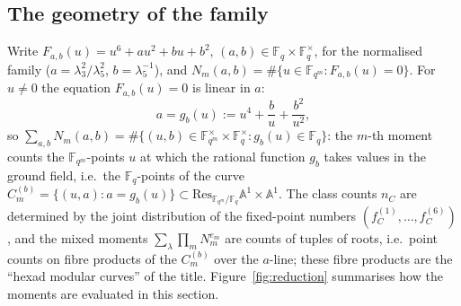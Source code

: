 \documentclass[12pt,a4paper]{amsart}
\theoremstyle{definition}
\newcommand{\F}{\mathbb{F}}
\begin{document}
\subsection{The geometry of the family}
Write $F_{a,b}(u)=u^6+au^2+bu+b^2$, $(a,b)\in\F_q\times\F_q^\times$, for the normalised family ($a=\lambda_3^2/\lambda_5^2$, $b=\lambda_5^{-1}$), and $N_m(a,b)=\#\{u\in\F_{q^m}:F_{a,b}(u)=0\}$. For $u\ne0$ the equation $F_{a,b}(u)=0$ is linear in $a$:
\begin{equation}\label{eq:a}
a=g_b(u):=u^4+\frac bu+\frac{b^2}{u^2},
\end{equation}
so $\sum_{a,b}N_m(a,b)=\#\{(u,b)\in\F_{q^m}^\times\times\F_q^\times:g_b(u)\in\F_q\}$: the $m$-th moment counts the $\F_{q^m}$-points $u$ at which the rational function $g_b$ takes values in the ground field, i.e.\ the $\F_q$-points of the curve $C_m^{(b)}=\{(u,a):a=g_b(u)\}\subset\mathrm{Res}_{\F_{q^m}/\F_q}\mathbb A^1\times\mathbb A^1$. The class counts $n_C$ are determined by the joint distribution of the fixed-point numbers $(f^{(1)}_C,\dots,f^{(6)}_C)$, and the mixed moments $\sum_\lambda\prod_mN_m^{e_m}$ are counts of tuples of roots, i.e.\ point counts on fibre products of the $C_m^{(b)}$ over the $a$-line; these fibre products are the ``hexad modular curves'' of the title. Figure~\ref{fig:reduction} summarises how the moments are evaluated in this section.
\end{document}
